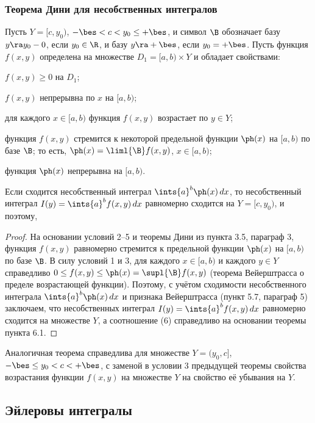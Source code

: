 \documentclass[a4paper]{article}
\begin{document}
\subsubsection{Теорема Дини для несобственных интегралов}

\begin{theorem}
Пусть $Y=[c,y_0)$, $-\bes<c<y_0\le + \bes$, и символ $\B$ обозначает
базу $y\ra y_0-0$, если $y_0\in\R$, и базу $y\ra+\bes$, если
$y_0=+\bes$. Пусть функция $f(x,y)$ определена на множестве
$D_1=[a,b)\times Y$ и обладает свойствами: \begin{nums}{-2} \item
$f(x,y)\ge0$ на $D_1$; \item $f(x,y)$ непрерывна по $x$ на $[a,b)$;
\item для каждого $x\in[a,b)$ функция $f(x,y)$ возрастает по $y\in
Y$; \item функция $f(x,y)$ стремится к некоторой предельной функции
$\ph(x)$ на $[a,b)$ по базе $\B$; то есть, $\ph(x) = \liml{\B}
f(x,y)$, $x\in[a,b)$; \item функция $\ph(x)$ непрерывна на $[a,b)$.
\end{nums} Если сходится несобственный интеграл $\ints{a}^b
\ph(x)\,dx$, то несобственный интеграл $I(y) = \ints{a}^b
f(x,y)\,dx$ равномерно сходится на $Y=[c,y_0)$, и поэтому,
\end{theorem}

\begin{proof}
На основании условий 2--5 и теоремы Дини из пункта 3.5, параграф 3,
функция $f(x,y)$ равномерно стремится к предельной функции $\ph(x)$
на $[a,b)$ по базе $\B$. В силу условий 1 и 3, для каждого
$x\in[a,b)$ и каждого $y\in Y$ справедливо $0\le f(x,y) \le \ph(x) =
\supl{\B} f(x,y)$ (теорема Вейерштрасса о пределе возрастающей
функции). Поэтому, с учётом сходимости несобственного интеграла
$\ints{a}^b \ph(x)\,dx$ и признака Вейерштрасса (пункт 5.7, параграф
5) заключаем, что несобственных интеграл $I(y) = \ints{a}^b
f(x,y)\,dx$ равномерно сходится на множестве $Y$, а соотношение (6)
справедливо на основании теоремы пункта 6.1.
\end{proof}

Аналогичная теорема справедлива для множестве $Y=(y_0,c]$, $-\bes\le
y_0<c<+\bes$, с заменой в условии 3 предыдущей теоремы свойства
возрастания функции $f(x,y)$ на множестве $Y$ на свойство её
убывания на $Y$.

\subsection{Эйлеровы интегралы}
\end{document}

